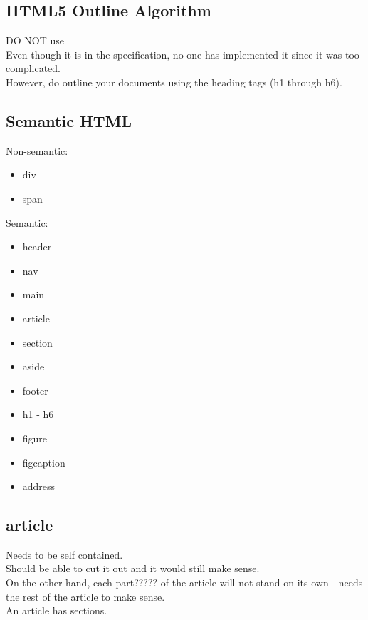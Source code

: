 \documentclass[]{article}
\newcommand{\<}{\guilsinglleft}
\renewcommand{\>}{\guilsinglright}
\begin{document}
\subsection{HTML5 Outline Algorithm}
DO NOT use
\\
Even though it is in the specification, no one has implemented it since it was too complicated.
\\
However, do outline your documents using the heading tags (h1 through h6).

\subsection{Semantic HTML}
Non-semantic:
\begin{itemize}
	\item div
	\item span
\end{itemize}
Semantic:
\begin{itemize}
	\item header
	\item nav
	\item main
	\item article
	\item section
	\item aside
	\item footer
	\item h1 - h6
	\item figure
	\item figcaption
	\item address
\end{itemize}

\subsection{article}
Needs to be self contained.  
\\
Should be able to cut it out and it would still make sense.
\\
On the other hand, each part????? of the article will not stand on its own - needs the rest of the article to make sense.
\\
An article has sections.
\end{document}
